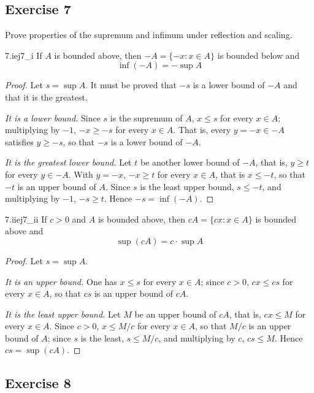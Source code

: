 \documentclass[11pt, a4paper]{article}
\begin{document}
\subsection*{Exercise 7}

Prove properties of the supremum and infimum under reflection and scaling.

\begin{proposicion}{7.i}{ej7_i}
If $A$ is bounded above, then $-A = \{-x : x \in A\}$ is bounded below and
$$ \inf(-A) = -\sup A $$
\end{proposicion}

\begin{proof}
Let $s = \sup A$. It must be proved that $-s$ is a lower bound of $-A$ and that it is the greatest.

\textit{It is a lower bound.} Since $s$ is the supremum of $A$, $x \le s$ for every $x \in A$; multiplying
by $-1$, $-x \ge -s$ for every $x \in A$. That is, every $y = -x \in -A$ satisfies $y \ge -s$, so that
$-s$ is a lower bound of $-A$.

\textit{It is the greatest lower bound.} Let $t$ be another lower bound of $-A$, that is, $y \ge t$ for every
$y \in -A$. With $y = -x$, $-x \ge t$ for every $x \in A$, that is $x \le -t$, so that $-t$ is an
upper bound of $A$. Since $s$ is the least upper bound, $s \le -t$, and multiplying by $-1$,
$-s \ge t$. Hence $-s = \inf(-A)$.
\end{proof}

\begin{proposicion}{7.ii}{ej7_ii}
If $c > 0$ and $A$ is bounded above, then $cA = \{cx : x \in A\}$ is bounded above
and
$$ \sup(cA) = c \cdot \sup A $$
\end{proposicion}

\begin{proof}
Let $s = \sup A$.

\textit{It is an upper bound.} One has $x \le s$ for every $x \in A$; since $c > 0$, $cx \le cs$ for
every $x \in A$, so that $cs$ is an upper bound of $cA$.

\textit{It is the least upper bound.} Let $M$ be an upper bound of $cA$, that is, $cx \le M$ for every
$x \in A$. Since $c > 0$, $x \le M/c$ for every $x \in A$, so that $M/c$ is an upper bound of $A$;
since $s$ is the least, $s \le M/c$, and multiplying by $c$, $cs \le M$. Hence $cs = \sup(cA)$.
\end{proof}

\subsection*{Exercise 8}
\end{document}
